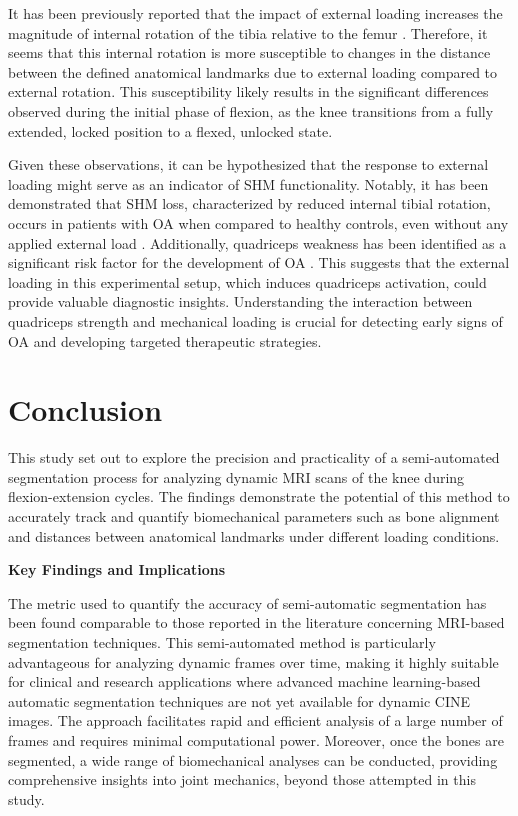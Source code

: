 \documentclass{micro-econ-thesis}
\begin{document}
It has been previously reported that the impact of external loading increases the magnitude of internal rotation of the tibia relative to the femur \parencite{myers_vivo_2012}. Therefore, it seems that this internal rotation is more susceptible to changes in the distance between the defined anatomical landmarks due to external loading compared to external rotation. This susceptibility likely results in the significant differences observed during the initial phase of flexion, as the knee transitions from a fully extended, locked position to a flexed, unlocked state.  

Given these observations, it can be hypothesized that the response to external loading might serve as an indicator of SHM functionality. Notably, it has been demonstrated that SHM loss, characterized by reduced internal tibial rotation, occurs in patients with OA when compared to healthy controls, even without any applied external load \parencite{jeon_alteration_2020}. Additionally, quadriceps weakness has been identified as a significant risk factor for the development of OA \parencite{segal_is_2011}. This suggests that the external loading in this experimental setup, which induces quadriceps activation, could provide valuable diagnostic insights. Understanding the interaction between quadriceps strength and mechanical loading is crucial for detecting early signs of OA and developing targeted therapeutic strategies.

\section{Conclusion}

This study set out to explore the precision and practicality of a semi-automated segmentation process for analyzing dynamic MRI scans of the knee during flexion-extension cycles. The findings demonstrate the potential of this method to accurately track and quantify biomechanical parameters such as bone alignment and distances between anatomical landmarks under different loading conditions.

\textbf{Key Findings and Implications}

The metric used to quantify the accuracy of semi-automatic segmentation has been found comparable to those reported in the literature concerning MRI-based segmentation techniques. This semi-automated method is particularly advantageous for analyzing dynamic frames over time, making it highly suitable for clinical and research applications where advanced machine learning-based automatic segmentation techniques are not yet available for dynamic CINE images. The approach facilitates rapid and efficient analysis of a large number of frames and requires minimal computational power. Moreover, once the bones are segmented, a wide range of biomechanical analyses can be conducted, providing comprehensive insights into joint mechanics, beyond those attempted in this study.
\end{document}
